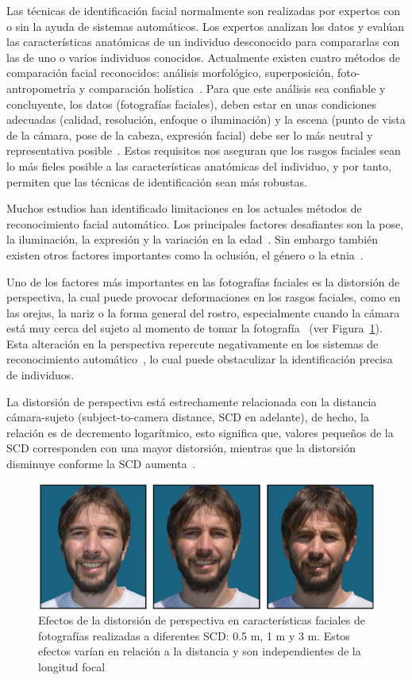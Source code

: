 Las técnicas de identificación facial normalmente son realizadas por expertos con o sin la ayuda de sistemas automáticos. Los expertos analizan los datos y evalúan las características anatómicas de un individuo desconocido para compararlas con las de uno o varios individuos conocidos. Actualmente existen cuatro métodos de comparación facial reconocidos: análisis morfológico, superposición, foto-antropometría y comparación holística~\cite{3}.
Para que este análisis sea confiable y concluyente, los datos (fotografías faciales), deben estar en unas condiciones adecuadas (calidad, resolución, enfoque o iluminación) y la escena (punto de vista de la cámara, pose de la cabeza, expresión facial) debe ser lo más neutral y representativa posible~\cite{1,2}. Estos requisitos nos aseguran que los rasgos faciales sean lo más fieles posible a las características anatómicas del individuo, y por tanto, permiten que las técnicas de identificación sean más robustas.

Muchos estudios han identificado limitaciones en los actuales métodos de reconocimiento facial automático. Los principales factores desafiantes son la pose, la iluminación, la expresión y la variación en la edad~\cite{4,6}. Sin embargo también existen otros factores importantes como la oclusión, el género o la etnia~\cite{5,7}.

Uno de los factores más importantes en las fotografías faciales es la distorsión de perspectiva, la cual puede provocar deformaciones en los rasgos faciales, como en las orejas, la nariz o la forma general del rostro, especialmente cuando la cámara está muy cerca del sujeto al momento de tomar la fotografía~\cite{12} (ver Figura~\ref{fig1}). Esta alteración en la perspectiva repercute negativamente en los sistemas de reconocimiento automático~\cite{9,10,11}, lo cual puede obstaculizar la identificación precisa de individuos. 

La distorsión de perspectiva está estrechamente relacionada con la distancia cámara-sujeto (subject-to-camera distance, SCD en adelante), de hecho, la relación es de decremento logarítmico, esto significa que, valores pequeños de la SCD corresponden con una mayor distorsión, mientras que la distorsión disminuye conforme la SCD aumenta~\cite{23}.

\begin{figure}[h]
	\centering
	\includegraphics[scale=0.25]{imagenes/cap1/facial_distortion.png}
	\caption{Efectos de la distorsión de perspectiva en características faciales de fotografías realizadas a diferentes SCD: 0.5 m, 1 m y 3 m. Estos efectos varían en relación a la distancia y son independientes de la longitud focal~\cite{14}}
	\label{fig1}
\end{figure}

